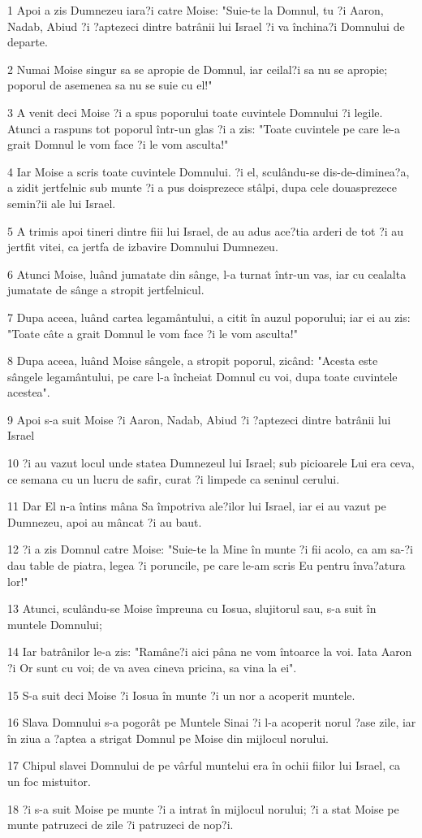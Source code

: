 \par 1 Apoi a zis Dumnezeu iara?i catre Moise: "Suie-te la Domnul, tu ?i Aaron, Nadab, Abiud ?i ?aptezeci dintre batrânii lui Israel ?i va închina?i Domnului de departe.
\par 2 Numai Moise singur sa se apropie de Domnul, iar ceilal?i sa nu se apropie; poporul de asemenea sa nu se suie cu el!"
\par 3 A venit deci Moise ?i a spus poporului toate cuvintele Domnului ?i legile. Atunci a raspuns tot poporul într-un glas ?i a zis: "Toate cuvintele pe care le-a grait Domnul le vom face ?i le vom asculta!"
\par 4 Iar Moise a scris toate cuvintele Domnului. ?i el, sculându-se dis-de-diminea?a, a zidit jertfelnic sub munte ?i a pus doisprezece stâlpi, dupa cele douasprezece semin?ii ale lui Israel.
\par 5 A trimis apoi tineri dintre fiii lui Israel, de au adus ace?tia arderi de tot ?i au jertfit vitei, ca jertfa de izbavire Domnului Dumnezeu.
\par 6 Atunci Moise, luând jumatate din sânge, l-a turnat într-un vas, iar cu cealalta jumatate de sânge a stropit jertfelnicul.
\par 7 Dupa aceea, luând cartea legamântului, a citit în auzul poporului; iar ei au zis: "Toate câte a grait Domnul le vom face ?i le vom asculta!"
\par 8 Dupa aceea, luând Moise sângele, a stropit poporul, zicând: "Acesta este sângele legamântului, pe care l-a încheiat Domnul cu voi, dupa toate cuvintele acestea".
\par 9 Apoi s-a suit Moise ?i Aaron, Nadab, Abiud ?i ?aptezeci dintre batrânii lui Israel
\par 10 ?i au vazut locul unde statea Dumnezeul lui Israel; sub picioarele Lui era ceva, ce semana cu un lucru de safir, curat ?i limpede ca seninul cerului.
\par 11 Dar El n-a întins mâna Sa împotriva ale?ilor lui Israel, iar ei au vazut pe Dumnezeu, apoi au mâncat ?i au baut.
\par 12 ?i a zis Domnul catre Moise: "Suie-te la Mine în munte ?i fii acolo, ca am sa-?i dau table de piatra, legea ?i poruncile, pe care le-am scris Eu pentru înva?atura lor!"
\par 13 Atunci, sculându-se Moise împreuna cu Iosua, slujitorul sau, s-a suit în muntele Domnului;
\par 14 Iar batrânilor le-a zis: "Ramâne?i aici pâna ne vom întoarce la voi. Iata Aaron ?i Or sunt cu voi; de va avea cineva pricina, sa vina la ei".
\par 15 S-a suit deci Moise ?i Iosua în munte ?i un nor a acoperit muntele.
\par 16 Slava Domnului s-a pogorât pe Muntele Sinai ?i l-a acoperit norul ?ase zile, iar în ziua a ?aptea a strigat Domnul pe Moise din mijlocul norului.
\par 17 Chipul slavei Domnului de pe vârful muntelui era în ochii fiilor lui Israel, ca un foc mistuitor.
\par 18 ?i s-a suit Moise pe munte ?i a intrat în mijlocul norului; ?i a stat Moise pe munte patruzeci de zile ?i patruzeci de nop?i.

